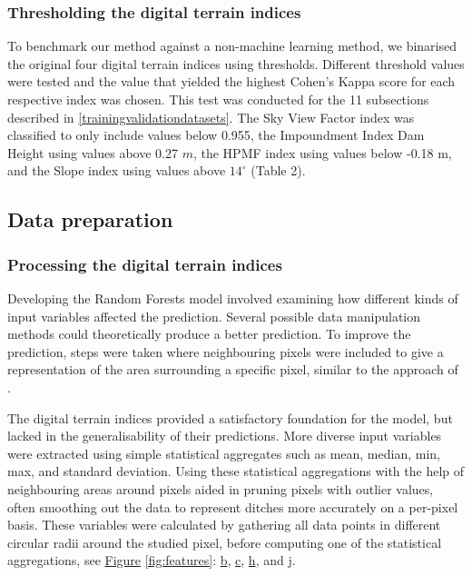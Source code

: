 \documentclass[]{interact}
\theoremstyle{plain}%
\theoremstyle{definition}
\theoremstyle{remark}
\begin{document}
\subsubsection{Thresholding the digital terrain indices}
To benchmark our method against a non-machine learning method, we binarised the original four digital terrain indices using thresholds. Different threshold values were tested and the value that yielded the highest Cohen's Kappa score for each respective index was chosen. This test was conducted for the 11 subsections described in \ref{trainingvalidationdatasets}. The Sky View Factor index was classified to only include values below 0.955, the Impoundment Index Dam Height using values above 0.27 $m$, the HPMF index using values below -0.18 m, and the Slope index using values above $14 ^{\circ}$ (Table 2). 

\subsection{Data preparation}

\subsubsection{Processing the digital terrain indices}
Developing the Random Forests model involved examining how different kinds of input variables affected the prediction. Several possible data manipulation methods could theoretically produce a better prediction. To improve the prediction, steps were taken where neighbouring pixels were included to give a representation of the area surrounding a specific pixel, similar to the approach of \citet{roelens}. 

The digital terrain indices provided a satisfactory foundation for the model, but lacked in the generalisability of their predictions. More diverse input variables were extracted using simple statistical aggregates such as mean, median, min, max, and standard deviation. Using these statistical aggregations with the help of neighbouring areas around pixels aided in pruning pixels with outlier values, often smoothing out the data to represent ditches more accurately on a per-pixel basis. These variables were calculated by gathering all data points in different circular radii around the studied pixel, before computing one of the statistical aggregations, see \hyperref[fig:features]{Figure} \ref{fig:features}: \hyperref[fig:features]{b}, \hyperref[fig:features]{c}, \hyperref[fig:features]{h}, and \hyperref[fig:features]{j}.
\end{document}

